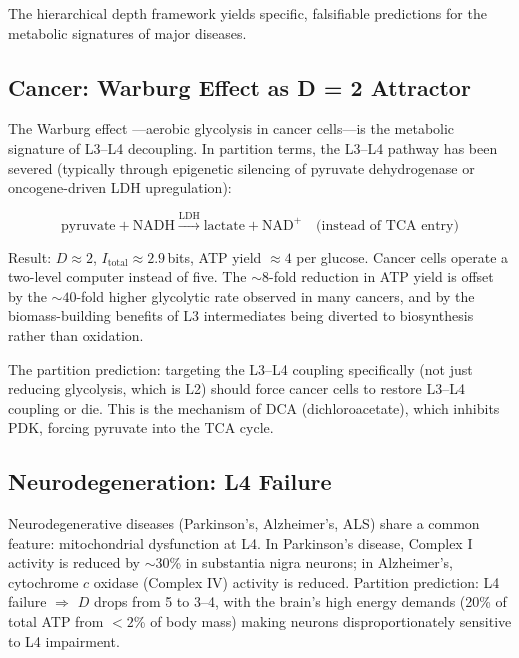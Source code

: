 The hierarchical depth framework yields specific, falsifiable predictions
for the metabolic signatures of major diseases.

\subsection{Cancer: Warburg Effect as D = 2 Attractor}
\label{ssec:cancer}

The Warburg effect \citep{Warburg1956}---aerobic glycolysis in cancer
cells---is the metabolic signature of L3--L4 decoupling. In partition
terms, the L3--L4 pathway has been severed (typically through epigenetic
silencing of pyruvate dehydrogenase or oncogene-driven LDH upregulation):

\begin{equation}
  \text{pyruvate} + \mathrm{NADH} \xrightarrow{\mathrm{LDH}} \text{lactate} + \mathrm{NAD}^+
  \quad \text{(instead of TCA entry)}
  \label{eq:warburg}
\end{equation}

Result: $D \approx 2$, $I_{\mathrm{total}} \approx 2.9$\,bits, ATP yield
$\approx 4$ per glucose. Cancer cells operate a two-level computer instead
of five. The $\sim 8$-fold reduction in ATP yield is offset by the $\sim 40$-fold
higher glycolytic rate observed in many cancers, and by the biomass-building
benefits of L3 intermediates being diverted to biosynthesis rather than oxidation.

The partition prediction: targeting the L3--L4 coupling specifically (not just
reducing glycolysis, which is L2) should force cancer cells to restore L3--L4
coupling or die. This is the mechanism of DCA (dichloroacetate), which inhibits
PDK, forcing pyruvate into the TCA cycle.

\subsection{Neurodegeneration: L4 Failure}
\label{ssec:neurodegeneration}

Neurodegenerative diseases (Parkinson's, Alzheimer's, ALS) share a common
feature: mitochondrial dysfunction at L4. In Parkinson's disease, Complex I
activity is reduced by $\sim 30$\% in substantia nigra neurons; in
Alzheimer's, cytochrome $c$ oxidase (Complex IV) activity is reduced.
Partition prediction: L4 failure $\Rightarrow$ $D$ drops from 5 to 3--4,
with the brain's high energy demands (20\% of total ATP from $<2$\% of
body mass) making neurons disproportionately sensitive to L4 impairment.

